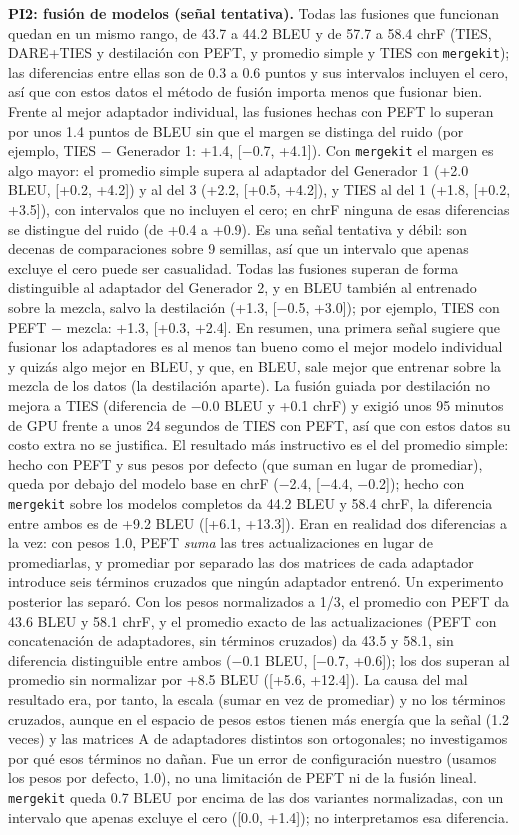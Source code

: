 \documentclass[11pt,a4paper]{article}
\begin{document}
\textbf{PI2: fusión de modelos (señal tentativa).} Todas las fusiones que funcionan quedan en un mismo rango, de 43.7 a 44.2 BLEU y de 57.7 a 58.4 chrF (TIES, DARE+TIES y destilación con PEFT, y promedio simple y TIES con \texttt{mergekit}); las diferencias entre ellas son de 0.3 a 0.6 puntos y sus intervalos incluyen el cero, así que con estos datos el método de fusión importa menos que fusionar bien. Frente al mejor adaptador individual, las fusiones hechas con PEFT lo superan por unos 1.4 puntos de BLEU sin que el margen se distinga del ruido (por ejemplo, TIES $-$ Generador 1: +1.4, [$-$0.7, +4.1]). Con \texttt{mergekit} el margen es algo mayor: el promedio simple supera al adaptador del Generador 1 (+2.0 BLEU, [+0.2, +4.2]) y al del 3 (+2.2, [+0.5, +4.2]), y TIES al del 1 (+1.8, [+0.2, +3.5]), con intervalos que no incluyen el cero; en chrF ninguna de esas diferencias se distingue del ruido (de +0.4 a +0.9). Es una señal tentativa y débil: son decenas de comparaciones sobre 9 semillas, así que un intervalo que apenas excluye el cero puede ser casualidad. Todas las fusiones superan de forma distinguible al adaptador del Generador 2, y en BLEU también al entrenado sobre la mezcla, salvo la destilación (+1.3, [$-$0.5, +3.0]); por ejemplo, TIES con PEFT $-$ mezcla: +1.3, [+0.3, +2.4]. En resumen, una primera señal sugiere que fusionar los adaptadores es al menos tan bueno como el mejor modelo individual y quizás algo mejor en BLEU, y que, en BLEU, sale mejor que entrenar sobre la mezcla de los datos (la destilación aparte). La fusión guiada por destilación no mejora a TIES (diferencia de $-$0.0 BLEU y +0.1 chrF) y exigió unos 95 minutos de GPU frente a unos 24 segundos de TIES con PEFT, así que con estos datos su costo extra no se justifica. El resultado más instructivo es el del promedio simple: hecho con PEFT y sus pesos por defecto (que suman en lugar de promediar), queda por debajo del modelo base en chrF ($-$2.4, [$-$4.4, $-$0.2]); hecho con \texttt{mergekit} sobre los modelos completos da 44.2 BLEU y 58.4 chrF, la diferencia entre ambos es de +9.2 BLEU ([+6.1, +13.3]). Eran en realidad dos diferencias a la vez: con pesos 1.0, PEFT \emph{suma} las tres actualizaciones en lugar de promediarlas, y promediar por separado las dos matrices de cada adaptador introduce seis términos cruzados que ningún adaptador entrenó. Un experimento posterior las separó. Con los pesos normalizados a 1/3, el promedio con PEFT da 43.6 BLEU y 58.1 chrF, y el promedio exacto de las actualizaciones (PEFT con concatenación de adaptadores, sin términos cruzados) da 43.5 y 58.1, sin diferencia distinguible entre ambos ($-$0.1 BLEU, [$-$0.7, +0.6]); los dos superan al promedio sin normalizar por +8.5 BLEU ([+5.6, +12.4]). La causa del mal resultado era, por tanto, la escala (sumar en vez de promediar) y no los términos cruzados, aunque en el espacio de pesos estos tienen más energía que la señal (1.2 veces) y las matrices A de adaptadores distintos son ortogonales; no investigamos por qué esos términos no dañan. Fue un error de configuración nuestro (usamos los pesos por defecto, 1.0), no una limitación de PEFT ni de la fusión lineal. \texttt{mergekit} queda 0.7 BLEU por encima de las dos variantes normalizadas, con un intervalo que apenas excluye el cero ([0.0, +1.4]); no interpretamos esa diferencia.
\end{document}
